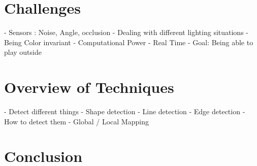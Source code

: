 \documentclass[12pt, a4paper]{scrartcl}
\begin{document}
  \section{Challenges}
  - Sensors : Noise, Angle, occlusion
  - Dealing with different lighting situations
  - Being Color invariant
  - Computational Power
  - Real Time
  - Goal: Being able to play outside

  \section{Overview of Techniques}
  - Detect different things
  - Shape detection
  - Line detection
  - Edge detection
  - How to detect them
  - Global / Local Mapping

  \section{Conclusion}
\end{document}
